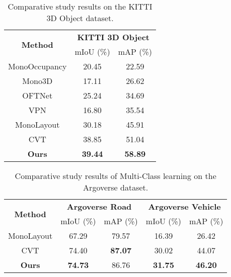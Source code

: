  \begin{table}[!t]
\caption{Comparative study results on the KITTI 3D Object dataset.}
\label{tb:result_comparative_3d}
\begin{center}
\begin{small}
\begin{tabular}{ccc}
\toprule
\multicolumn{1}{c}{\multirow{2}[2]{*}{\textbf{Method}}} & \multicolumn{2}{c}{\textbf{KITTI 3D Object}}\\ 
\cmidrule(lr){2-3}
 & mIoU (\%) & mAP (\%) \\

\midrule

MonoOccupancy \cite{lu2019monocular} & 20.45 & 22.59\\
Mono3D \cite{chen2016monocular}& 17.11 & 26.62\\
OFTNet \cite{roddick2019orthographic} & 25.24 & 34.69\\
VPN \cite{pan2020cross}& 16.80 & 35.54\\
MonoLayout \cite{mani2020monolayout}& 30.18 & 45.91\\
CVT \cite{yang2021projecting} & 38.85 & 51.04\\ 
\midrule

\textbf{Ours}& \textbf{39.44} & \textbf{58.89} \\

\bottomrule
\end{tabular}
\end{small}
\end{center}
\end{table}
 \begin{table}[!t]
\caption{Comparative study results of Multi-Class learning on the Argoverse dataset.}
\label{tb:result_comparative_multiclass}
\begin{center}
\begin{footnotesize}
\begin{tabular}{ccccc}
\toprule
\multicolumn{1}{c}{\multirow{2}[2]{*}{\textbf{Method}}} & \multicolumn{2}{c}{\textbf{Argoverse Road}} & \multicolumn{2}{c}{\textbf{Argoverse Vehicle}} \\ 
\cmidrule(lr){2-5}
 & mIoU (\%) & mAP (\%) & mIoU (\%) & mAP (\%)  \\

\midrule
MonoLayout \cite{mani2020monolayout} & 67.29& 79.57 & 16.39 & 26.42 \\
CVT \cite{yang2021projecting} & 74.40 & \textbf{87.07} & 30.02& 44.07 \\
\midrule
\textbf{Ours} &\textbf{74.73}&86.76&\textbf{31.75}&\textbf{46.20}\\

\bottomrule
\end{tabular}
\end{footnotesize}
\end{center}
\end{table}

 